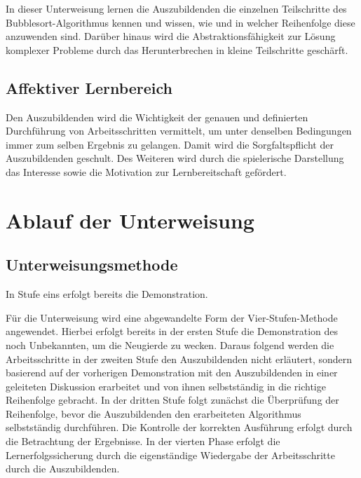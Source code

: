 In dieser Unterweisung lernen die Auszubildenden die einzelnen Teilschritte des Bubblesort-Algorithmus kennen und wissen, wie und in welcher Reihenfolge diese anzuwenden sind. Darüber hinaus wird die Abstraktionsfähigkeit zur Lösung komplexer Probleme durch das Herunterbrechen in kleine Teilschritte geschärft.

\section{Affektiver Lernbereich}

Den Auszubildenden wird die Wichtigkeit der genauen und definierten Durchführung von Arbeitsschritten vermittelt, um unter denselben Bedingungen immer zum selben Ergebnis zu gelangen. Damit wird die Sorgfaltspflicht der Auszubildenden geschult. Des Weiteren wird durch die spielerische Darstellung das Interesse sowie die Motivation zur Lernbereitschaft gefördert. 





\chapter{Ablauf der Unterweisung}

\section{Unterweisungsmethode}
In Stufe eins erfolgt bereits die Demonstration.

Für die Unterweisung wird eine abgewandelte Form der Vier-Stufen-Methode angewendet. Hierbei erfolgt bereits in der ersten Stufe die Demonstration des noch Unbekannten, um die Neugierde zu wecken. Daraus folgend werden die Arbeitsschritte in der zweiten Stufe den Auszubildenden nicht erläutert, sondern basierend auf der vorherigen Demonstration mit den Auszubildenden in einer geleiteten Diskussion erarbeitet und von ihnen selbstständig in die richtige Reihenfolge gebracht. In der dritten Stufe folgt zunächst die Überprüfung der Reihenfolge, bevor die Auszubildenden den erarbeiteten Algorithmus selbstständig durchführen. Die Kontrolle der korrekten Ausführung erfolgt durch die Betrachtung der Ergebnisse. In der vierten Phase erfolgt die Lernerfolgssicherung durch die eigenständige Wiedergabe der Arbeitsschritte durch die Auszubildenden.

